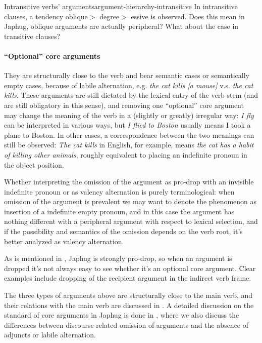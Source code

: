 \documentclass[a4paper, oneside, 12pt]{report}
\newcommand*{\textgt}{$>$ }
\newcommand{\form}[1]{\emph{#1}}
\begin{document}
\begin{todobox}{Intransitive verbs' arguments}{argument-hierarchy-intransitive}
    In intransitive clauses, a tendency oblique\textgt degree\textgt essive is observed.
    Does this mean in Japhug, oblique arguments are actually peripheral?
    What about the case in transitive clauses? 
\end{todobox}

\paragraph*{``Optional'' core arguments}\label{sec:grammatical.clause.internal.optional-core}
They are structurally close to the verb and bear semantic cases or semantically empty cases,
because of labile alternation,
e.g. \form{the cat kills [a mouse]} v.s. \form{the cat kills}.
These arguments are still dictated by the lexical entry of the verb stem
(and are still obligatory in this sense),
and removing one ``optional''  core argument
may change the meaning of the verb in a (slightly or greatly) irregular way:
\form{I fly} can be interpreted in various ways,
but \form{I flied to Boston} usually means I took a plane to Boston.
In other cases, a correspondence between the two meanings can still be observed:
\form{The cat kills} in English, for example, 
means \form{the cat has a habit of killing other animals},
roughly equivalent to placing an indefinite pronoun in the object position.

Whether interpreting the omission of the argument
as pro-drop with an invisible indefinite pronoun
or as valency alternation is purely terminological:
when omission of the argument is prevalent we may want to 
denote the phenomenon as insertion of a indefinite empty pronoun,
and in this case the argument has nothing different with a peripheral argument with respect to lexical selection,
and if the possibility and semantics of the omission depends on the verb root,
it's better analyzed as valency alternation.

As is mentioned in ,
Japhug is strongly pro-drop,
so when an argument is dropped it's not always easy to see whether it's an optional core argument.
Clear examples include dropping of the recipient argument in the indirect verb frame.

The three types of arguments above are structurally close to the main verb,
and their relations with the main verb are discussed in .
A detailed discussion on the standard of core arguments in Japhug
is done in ,
where we also discuss the differences between discourse-related omission of arguments
and the absence of adjuncts or labile alternation.
\end{document}
